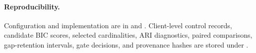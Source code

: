 \paragraph{Reproducibility.}
Configuration and implementation are in
 and
.
Client-level control records, candidate BIC scores, selected cardinalities,
ARI diagnostics, paired comparisons, gap-retention intervals, gate decisions,
and provenance hashes are stored under .
